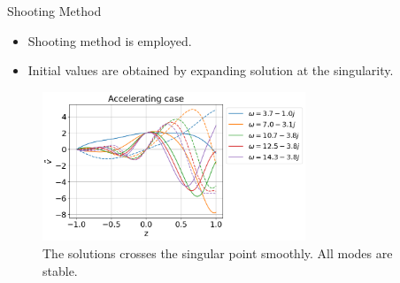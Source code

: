 \begin{frame}{Shooting Method}
  \begin{itemize}
    \item Shooting method is employed.
    \item Initial values are obtained by expanding solution at the singularity.
  \end{itemize}
  \begin{figure}[htbp]
    \begin{center}
      \includegraphics[width=0.7\textwidth]{figures/results-accelerating-v.png}
    \end{center}
    \caption{The solutions crosses the singular point smoothly. All modes are stable.}
    \label{fig:good-accelerating-v}
  \end{figure}
\end{frame}
